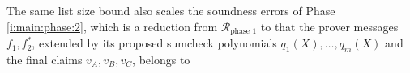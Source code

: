 
The same list size bound also scales the soundness errors of Phase \ref{i:main:phase:2}, which is a reduction from $\mathcal R_\text{phase 1}$ to that the prover messages $f_1,f_2^*$, extended by its proposed sumcheck polynomials $q_1(X),\ldots, q_m(X)$ and the final claims $v_A, v_B, v_C$, belongs to 
